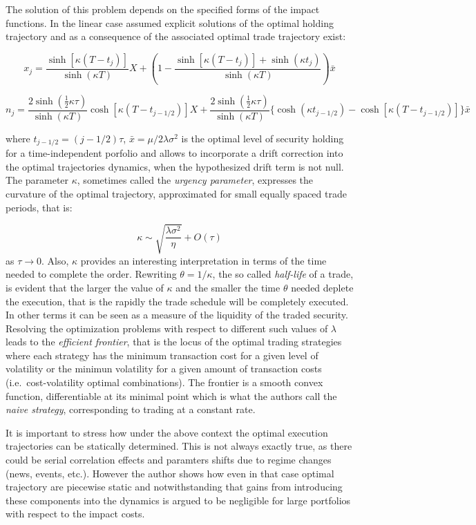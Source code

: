 The solution of this problem depends on the specified forms of the
impact functions. In the linear case assumed explicit solutions of the
optimal holding trajectory and as a consequence of the associated
optimal trade trajectory exist:

\[
x_{j} = \frac{\sinh[\kappa(T - t_{j})]}{\sinh(\kappa T)} X
        + (1 - \frac{\sinh[\kappa(T - t_{j})] + \sinh(\kappa t_{j})}{\sinh(\kappa T)}) \bar{x}
\]

\[
n_{j} = \frac{2 \sinh(\frac{1}{2} \kappa\tau)}{\sinh(\kappa T)} \cosh[\kappa(T - t_{j - 1/2})] X
        + \frac{2 \sinh(\frac{1}{2} \kappa \tau)}{\sinh(\kappa T)} \{\cosh(\kappa t_{j - 1/2}) - \cosh[\kappa (T - t_{j - 1/2})]\} \bar{x}
\]

where \(t_{j - 1/2} = (j - 1/2)\tau\),
\(\bar{x} = \mu/2 \lambda\sigma^2\) is the optimal level of security
holding for a time-independent porfolio and allows to incorporate a
drift correction into the optimal trajectories dynamics, when the
hypothesized drift term is not null. The parameter \(\kappa\), sometimes
called the \emph{urgency parameter}, expresses the curvature of the
optimal trajectory, approximated for small equally spaced trade periods,
that is:

\[ \kappa \sim \sqrt{\frac{\lambda\sigma^2}{\eta}} + O(\tau) \] as
\(\tau \to 0\). Also, \(\kappa\) provides an interesting interpretation
in terms of the time needed to complete the order. Rewriting
\(\theta = 1/\kappa\), the so called \emph{half-life} of a trade, is
evident that the larger the value of \(\kappa\) and the smaller the time
\(\theta\) needed deplete the execution, that is the rapidly the trade
schedule will be completely executed. In other terms it can be seen as a
measure of the liquidity of the traded security. Resolving the
optimization problems with respect to different such values of
\(\lambda\) leads to the \emph{efficient frontier}, that is the locus of
the optimal trading strategies where each strategy has the minimum
transaction cost for a given level of volatility or the minimun
volatility for a given amount of transaction costs (i.e.~cost-volatility
optimal combinations). The frontier is a smooth convex function,
differentiable at its minimal point which is what the authors call the
\emph{naive strategy}, corresponding to trading at a constant rate.

It is important to stress how under the above context the optimal
execution trajectories can be statically determined. This is not always
exactly true, as there could be serial correlation effects and paramters
shifts due to regime changes (news, events, etc.). However the author
shows how even in that case optimal trajectory are piecewise static and
notwithstanding that gains from introducing these components into the
dynamics is argued to be negligible for large portfolios with respect to
the impact costs.

